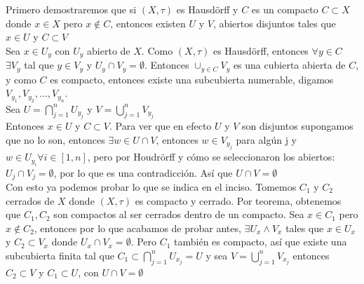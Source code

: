 \documentclass[12pt]{article}
\begin{document}
Primero demostraremos que si $(X, \tau)$ es Hausdörff y $C$ es un compacto $C\subset X$ donde $x \in X$ pero $x \notin C$, entonces existen $U$ y $V$, abiertos disjuntos tales que $x \in U$ y $C \subset V$
\\ Sea $x\in U_{y} $ con $U_y$ abierto de $X$. Como $(X, \tau)$ es Hausdörff, entonces $\forall y \in C$ $\exists V_{y}$ tal que $y \in V_{y}$ y $U_y \cap V_{y}=\emptyset$. Entonces $\cup_{y\in C}V_{y}$ es una cubierta abierta de $C$, y como $C$ es compacto, entonces existe una subcubierta numerable, digamos $V_{y_{1}},V_{y_2},...,V_{y_n}$.
\\Sea $U=\bigcap_{j=1}^nU_{y_j}$ y $ V=\bigcup_{j=1}^nV_{y_j}$
\\Entonces  $x\in U$ y $C\subset V$. Para ver que en efecto $U$ y $V$ son disjuntos supongamos que no lo son, entonces $\exists w \in U\cap V$, entonces $w \in V_{y_j}$ para algún j y $w\in U_{y_i} \forall i\in [1,n] $, pero por Houdrörff y cómo se seleccionaron los abiertos: $U_j\cap V_j=\emptyset$, por lo que es una contradicción. Así que $U\cap V=\emptyset$
\\Con esto ya podemos probar lo que se indica en el inciso. Tomemos $C_1$ y $C_2$ cerrados de $X$ donde $(X, \tau )$ es compacto y cerrado. Por teorema, obtenemos que $C_1,C_2$ son compactos al ser cerrados dentro de un compacto. Sea $x\in C_1$ pero $x\notin C_2$, entonces por lo que acabamos de probar antes, $\exists U_x \wedge V_x$ tales que $x \in U_x$ y $C_2 \subset V_x$ donde $U_x \cap V_x=\emptyset$. Pero $C_1$ también es compacto, así que existe una subcubierta finita tal que $C_1 \subset \bigcap_{j=1}^nU_{x_j}=U$ y sea $V= \bigcup_{j=1}^nV_{x_j}$ entonces $C_2 \subset V$ y $C_1\subset U$, con $U \cap V=\emptyset$
\end{document}
